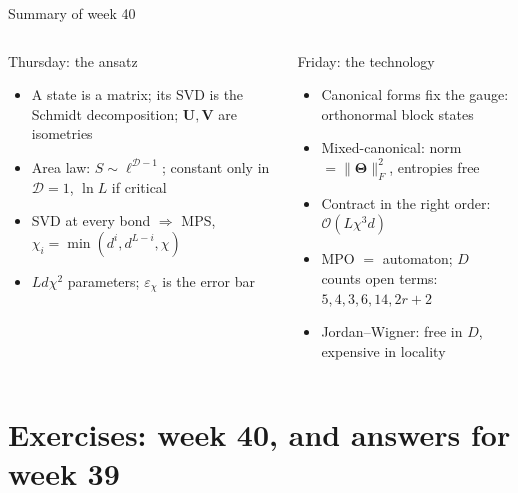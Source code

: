 \documentclass[aspectratio=169,10pt]{beamer}
\newcommand{\bigO}{\mathcal{O}}
\newcommand{\bmat}[1]{\bm{#1}}
\begin{document}
\begin{frame}{Summary of week 40}
  \small
  \begin{columns}[T]
    \begin{block}{Thursday: the ansatz}
      \begin{itemize}
        \item A state is a matrix; its SVD is the Schmidt decomposition; $\bmat U,\bmat V$ are isometries
        \item Area law: $S\sim\ell^{\mathcal D-1}$; constant only in $\mathcal D=1$, $\ln L$ if critical
        \item SVD at every bond $\Rightarrow$ MPS, $\chi_i=\min(d^i,d^{L-i},\chi)$
        \item $Ld\chi^2$ parameters; $\varepsilon_\chi$ is the error bar
      \end{itemize}
    \end{block}
    \begin{block}{Friday: the technology}
      \begin{itemize}
        \item Canonical forms fix the gauge: orthonormal block states
        \item Mixed-canonical: norm $=\|\bm\Theta\|_F^2$, entropies free
        \item Contract in the right order: $\bigO(L\chi^3d)$
        \item MPO $=$ automaton; $D$ counts open terms: $5,4,3,6,14,2r+2$
        \item Jordan--Wigner: free in $D$, expensive in locality
      \end{itemize}
    \end{block}
  \end{columns}
\end{frame}

\section{Exercises: week 40, and answers for week 39}
\end{document}
